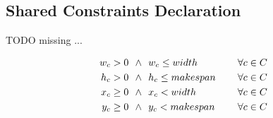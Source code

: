 \subsection{Shared Constraints Declaration}
    \colorbox{BurntOrange}{TODO missing ...}

    \begin{align*}
           w_c > 0\ \ \land\ &\ w_c \leq width\    &\ \hspace{0.2cm} \forall c \in C \\
           h_c > 0\ \ \land\ &\ h_c \leq makespan\ &\ \hspace{0.2cm} \forall c \in C \\
        x_c \geq 0\ \ \land\ &\ x_c < width\    &\ \hspace{0.2cm} \forall c \in C \\
        y_c \geq 0\ \ \land\ &\ y_c < makespan\ &\ \hspace{0.2cm} \forall c \in C
    \end{align*}